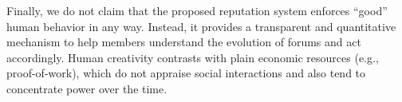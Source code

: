 \documentclass[10pt,twocolumn]{article}
\begin{document}
Finally, we do not claim that the proposed reputation system enforces ``good''
human behavior in any way.
Instead, it provides a transparent and quantitative mechanism to help members
understand the evolution of forums and act accordingly.
Human creativity contrasts with plain economic resources (e.g.,
proof-of-work), which do not appraise social interactions and also tend
to concentrate power over the time.
\fi



\end{document}
